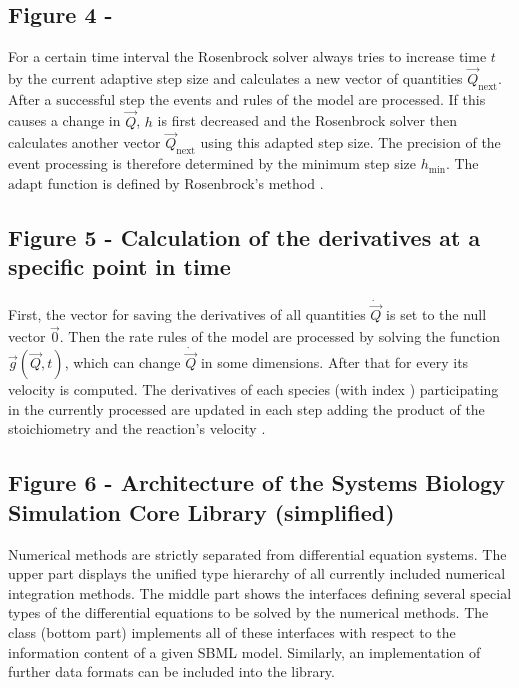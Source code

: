 \documentclass[10pt]{bmc_article}
\newenvironment{bmcformat}{\begin{raggedright}\baselineskip20pt\sloppy\setboolean{publ}{false}}{\end{raggedright}\baselineskip20pt\sloppy}
\begin{document}
\begin{bmcformat}
\subsection*{Figure 4 - }
For a certain time interval\COR{,} the Rosenbrock solver  always tries to increase time $t$ by the current adaptive
step size  and calculates a new vector of quantities $\vec{Q}_{\mathrm{next}}$.
After a successful step\COR{,} the events and rules of the model are processed.
If this causes a change in $\vec{Q}$, $h$ is first decreased and the
Rosenbrock solver then calculates another vector $\vec{Q}_\mathrm{next}$ using this adapted step size.
The precision of the event processing is therefore determined by the minimum step size $h_{\min}$.
The $\mathrm{adapt}$ function is defined by Rosenbrock's method \cite{Press1993}.

\subsection*{Figure 5 - Calculation of the derivatives at a specific point in time}
First, the vector for saving the derivatives of all quantities $\dot{\vec{Q}}$ is set to the null vector $\vec{0}$.
Then the rate rules of the model are processed by solving the function $\vec{g}(\vec{Q}, t)$, which can change $\dot{\vec{Q}}$ in some dimensions.
After that for every   its velocity  is computed.
The derivatives of each species (with index ) participating in the currently processed   are updated
in each step adding the product of the stoichiometry  and the reaction's velocity .

\subsection*{Figure 6 - Architecture of the Systems Biology Simulation Core Library (simplified)}
Numerical methods are strictly separated from differential equation systems. The
upper part displays the unified type hierarchy of all currently included numerical integration
methods. The middle part shows the interfaces defining several
special types of the differential equations to be solved by the numerical
methods.
The class \SBMLinterpreter (bottom part) implements all of these interfaces
with respect to the information content of a given \acs{SBML} model. Similarly, an
implementation of further data formats can be included into the
library.


\end{bmcformat}
\end{document}
